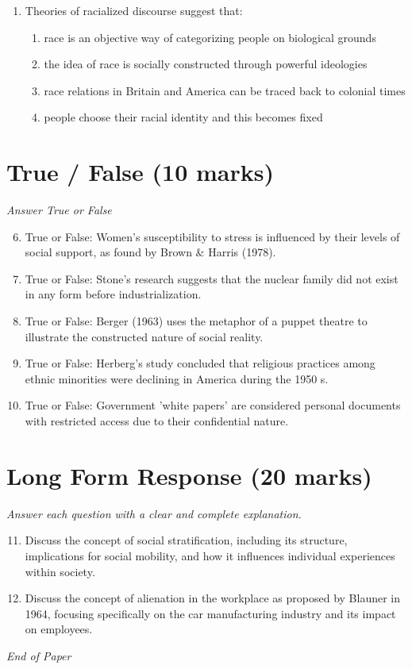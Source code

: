 \documentclass[12pt]{article}
\begin{document}
\begin{enumerate}[label=\arabic*.]
\begin{enumerate}[label=(\alph*)]
    \item non-criminal deviance
    \item global terrorism
\end{enumerate}
\item Theories of racialized discourse suggest that:
\begin{enumerate}[label=(\alph*)]
    \item race is an objective way of categorizing people on biological grounds
    \item the idea of race is socially constructed through powerful ideologies
    \item race relations in Britain and America can be traced back to colonial times
    \item people choose their racial identity and this becomes fixed
\end{enumerate}
\end{enumerate}

\section*{True / False (10 marks)}
\textit{Answer True or False}
\begin{enumerate}[label=\arabic*.]
\setcounter{enumi}{5}
\item True or False: Women's susceptibility to stress is influenced by their levels of social support, as found by Brown \& Harris (1978).
\item True or False: Stone's research suggests that the nuclear family did not exist in any form before industrialization.
\item True or False: Berger (1963) uses the metaphor of a puppet theatre to illustrate the constructed nature of social reality.
\item True or False: Herberg's study concluded that religious practices among ethnic minorities were declining in America during the 1950 s.
\item True or False: Government 'white papers' are considered personal documents with restricted access due to their confidential nature.
\end{enumerate}

\section*{Long Form Response (20 marks)}
\textit{Answer each question with a clear and complete explanation.}
\begin{enumerate}[label=\arabic*.]
\setcounter{enumi}{10}
\item Discuss the concept of social stratification, including its structure, implications for social mobility, and how it influences individual experiences within society.
\item Discuss the concept of alienation in the workplace as proposed by Blauner in 1964, focusing specifically on the car manufacturing industry and its impact on employees.
\end{enumerate}

\vfill
\noindent\textit{End of Paper}
\end{document}
